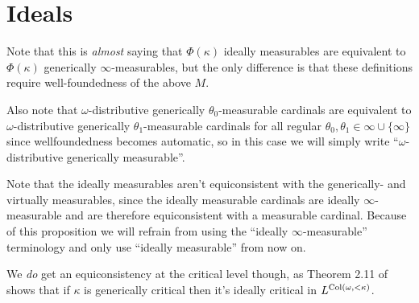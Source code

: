 \documentclass[../../main]{subfiles}
\begin{document}
\section{Ideals}


Note that this is \textit{almost} saying that $\Phi(\kappa)$ ideally measurables are equivalent to $\Phi(\kappa)$ generically $\infty$-measurables, but the only difference is that these definitions require well-foundedness of the above $M$.

\qquad Also note that $\omega$-distributive generically $\theta_0$-measurable cardinals are equivalent to $\omega$-distributive generically $\theta_1$-measurable cardinals for all regular $\theta_0,\theta_1\in\infty\cup\{\infty\}$ since wellfoundedness becomes automatic, so in this case we will simply write ``$\omega$-distributive generically measurable''.

\qquad Note that the ideally measurables aren't equiconsistent with the generically- and virtually measurables, since the ideally measurable cardinals are ideally $\infty$-measurable  and are therefore equiconsistent with a measurable cardinal. Because of this proposition we will refrain from using the ``ideally $\infty$-measurable'' terminology and only use ``ideally measurable'' from now on.

\qquad We \textit{do} get an equiconsistency at the critical level though, as Theorem 2.11 of \cite{FerberGitik} shows that if $\kappa$ is generically critical then it's ideally critical in $L^{\operatorname{Col}(\omega,{<}\kappa)}$.


\end{document}
